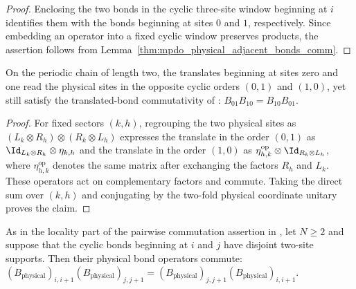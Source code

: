 \begin{proof}
    \leanok
    Enclosing the two bonds in the cyclic three-site window beginning at $i$
    identifies them with the bonds beginning at sites $0$ and $1$,
    respectively. Since embedding an operator into a fixed cyclic window
    preserves products, the assertion follows from
    Lemma~\ref{thm:mpdo_physical_adjacent_bonds_comm}.
\end{proof}

\begin{lemma}
    \label{thm:mpdo_physical_two_site_crossed_bonds_comm}
    \leanok
    On the periodic chain of length two, the translates beginning at sites
    zero and one read the physical sites in the opposite cyclic orders
    $(0,1)$ and $(1,0)$, yet still satisfy the translated-bond commutativity of
    \cite[Appendix~C.2, Proposition~C.8]{Cirac2016MPDO_arXiv}:
    $B_{01}B_{10}=B_{10}B_{01}$.
\end{lemma}

\begin{proof}
    \leanok
    For fixed sectors $(k,h)$, regrouping the two physical sites as
    $(L_k\otimes R_h)\otimes(R_k\otimes L_h)$ expresses the translate in the
    order $(0,1)$ as $\Id_{L_k\otimes R_h}\otimes\eta_{k,h}$ and the translate
    in the order $(1,0)$ as
    $\eta_{h,k}^{\mathrm{op}}\otimes\Id_{R_k\otimes L_h}$, where
    $\eta_{h,k}^{\mathrm{op}}$ denotes the same matrix after exchanging
    the factors $R_h$ and $L_k$. These operators act on complementary
    factors and commute. Taking the direct sum over $(k,h)$ and conjugating
    by the two-fold physical coordinate unitary proves the claim.
\end{proof}

\begin{lemma}
    \label{thm:mpdo_periodic_disjoint_physical_bonds_comm}
    \leanok
    As in the locality part of the pairwise commutation assertion in
    \cite[Appendix~C.2, Proposition~C.8, lines~1571--1593]
    {Cirac2016MPDO_arXiv}, let $N\geq 2$ and suppose that the cyclic bonds
    beginning at $i$ and $j$ have disjoint two-site supports. Then their
    physical bond operators commute:
    $(B_{\mathrm{physical}})_{i,i+1}
        (B_{\mathrm{physical}})_{j,j+1}
        =(B_{\mathrm{physical}})_{j,j+1}
        (B_{\mathrm{physical}})_{i,i+1}$.
\end{lemma}

